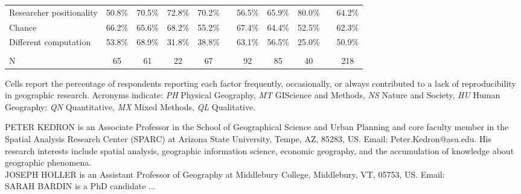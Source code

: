 \documentclass[]{interact}
\theoremstyle{plain}%
\theoremstyle{definition}
\theoremstyle{remark}
\begin{document}
\begin{landscape}
\begin{table}[h]
\begin{threeparttable}
\begin{tabular}{l c c c c c c c c c c}
         Researcher positionality           & 50.8\% & 70.5\% & 72.8\% & 70.2\% & & 56.5\% & 65.9\% & 80.0\% &  & 64.2\% \\
         Chance                             & 66.2\% & 65.6\% & 68.2\% & 55.2\% & & 67.4\% & 64.4\% & 52.5\% &  & 62.3\% \\
         Different computation              & 53.8\% & 68.9\% & 31.8\% & 38.8\% & & 63.1\% & 56.5\% & 25.0\% &  & 50.9\% \\
                                            & & & & & & & & & &\\
         N                                  & 65 & 61 & 22 & 67 & & 92 & 85 & 40 & & 218 \\
        \hline
    \end{tabular}
    \begin{tablenotes}
        \footnotesize
        \item Cells report the percentage of respondents reporting each factor frequently, occasionally, or always contributed to a lack of reproducibility in geographic research. Acronyms indicate: \textit{PH} Physical Geography, \textit{MT} GIScience and Methods, \textit{NS} Nature and Society, \textit{HU} Human Geography; \textit{QN} Quantitative, \textit{MX} Mixed Methods, \textit{QL} Qualitative. 
    \end{tablenotes}
    \label{tab:barriers}
    \end{threeparttable}
\end{table}
\end{landscape}
\newpage
\noindent PETER KEDRON is an Associate Professor in the School of Geographical Science and Urban Planning and core faculty member in the Spatial Analysis Research Center (SPARC) at Arizona State University, Tempe, AZ, 85283, US. Email: Peter.Kedron@asu.edu. His research interests include spatial analysis, geographic information science, economic geography, and the accumulation of knowledge about geographic phenomena. \\  
  
\noindent JOSEPH HOLLER is an Assistant Professor of Geography at Middlebury College, Middlebury, VT, 05753, US. Email: \\
  
\noindent SARAH BARDIN is a PhD candidate ...
\end{document}
